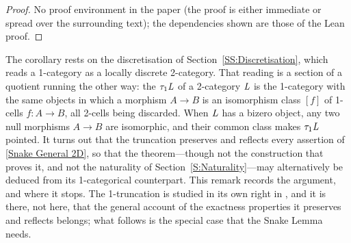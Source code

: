 \begin{proof}
  \leanok
  No proof environment in the paper (the proof is either immediate or spread over the surrounding text); the dependencies shown are those of the Lean proof.
\end{proof}

\begin{remark}
  \label{Rem Truncation}
  The corollary rests on the discretisation of Section~\ref{SS:Discretisation}, which reads a 1-category as a locally discrete 2-category. That reading is a section of a quotient running the other way: the  \(\tau_{1}\mathit{L}\) of a 2-category \(\mathit{L}\) is the 1-category with the same objects in which a morphism \(A\to B\) is an isomorphism class \([f]\) of 1-cells \(f\colon A\to B\), all 2-cells being discarded. When \(\mathit{L}\) has a bizero object, any two null morphisms \(A\to B\) are isomorphic, and their common class makes \(\tau_{1}\mathit{L}\) pointed. It turns out that the truncation preserves and reflects every assertion of \thex\ref{Snake General 2D}, so that the theorem---though not the construction that proves it, and not the naturality of Section~\ref{S:Naturality}---may alternatively be deduced from its 1-categorical counterpart. This remark records the argument, and where it stops. The 1-truncation is studied in its own right in \cite{CavJanMesRei26}, and it is there, not here, that the general account of the exactness properties it preserves and reflects belongs; what follows is the special case that the Snake Lemma needs.


\end{remark}
